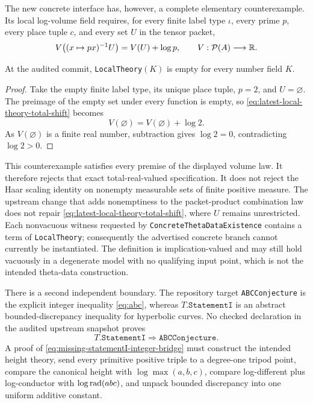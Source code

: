 The new concrete interface has, however, a complete elementary
counterexample.  Its local log-volume field requires, for every finite label
type $\iota$, every prime $p$, every place tuple $c$, and every set $U$ in
the tensor packet,
\begin{equation}\label{eq:latest-local-theory-total-shift}
 V\bigl((x\mapsto px)^{-1}U\bigr)=V(U)+\log p,
 \qquad V:\mathcal P(A)\longrightarrow\mathbb R.
\end{equation}

\begin{theorem}
\label{thm:latest-local-theory-empty}
At the audited commit, \texttt{LocalTheory}$(K)$ is empty for every number
field $K$.
\end{theorem}

\begin{proof}
Take the empty finite label type, its unique place tuple, $p=2$, and
$U=\varnothing$.  The preimage of the empty set under every function is
empty, so \eqref{eq:latest-local-theory-total-shift} becomes
\[
                        V(\varnothing)=V(\varnothing)+\log2.
\]
As $V(\varnothing)$ is a finite real number, subtraction gives
$\log2=0$, contradicting $\log2>0$.
\end{proof}

This counterexample satisfies every premise of the displayed volume law.
It therefore rejects that exact total-real-valued specification.  It does
not reject the Haar scaling identity on nonempty measurable sets of finite
positive measure.  The upstream change that adds nonemptiness to the
packet-product combination law does not repair
\eqref{eq:latest-local-theory-total-shift}, where $U$ remains unrestricted.
Each nonvacuous witness requested by
\texttt{ConcreteThetaDataExistence} contains a term of
\texttt{LocalTheory}; consequently the advertised concrete branch cannot
currently be instantiated.  The definition is implication-valued and may
still hold vacuously in a degenerate model with no qualifying input point,
which is not the intended theta-data construction.

There is a second independent boundary.  The repository target
\texttt{ABCConjecture} is the explicit integer inequality
\eqref{eq:abc}, whereas $T.\texttt{StatementI}$ is an abstract
bounded-discrepancy inequality for hyperbolic curves.  No checked
declaration in the audited upstream snapshot proves
\begin{equation}\label{eq:missing-statementI-integer-bridge}
                 T.\texttt{StatementI}\Longrightarrow
                 \texttt{ABCConjecture}.
\end{equation}
A proof of \eqref{eq:missing-statementI-integer-bridge} must construct the
intended height theory, send every primitive positive triple to a
degree-one tripod point, compare the canonical height with
$\log\max(a,b,c)$, compare log-different plus log-conductor with
$\log\operatorname{rad}(abc)$, and unpack bounded discrepancy into one uniform additive
constant.

